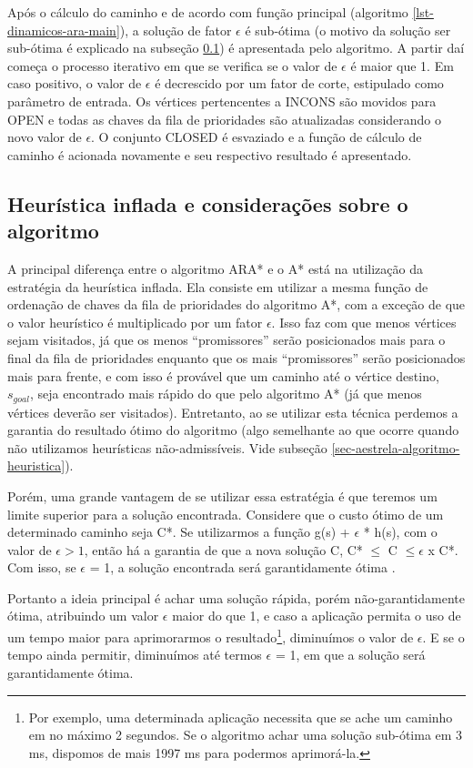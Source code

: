 Após o cálculo do caminho e de acordo com função principal (algoritmo \ref{lst-dinamicos-ara-main}), a solução de fator $\epsilon$ é sub-ótima (o motivo da solução ser sub-ótima é explicado na subseção \ref{sec-dinamicos-ara-consideracoes}) é apresentada pelo algoritmo. A partir daí começa o processo iterativo em que se verifica se o valor de $\epsilon$ é maior que 1. Em caso positivo, o valor de $\epsilon$ é decrescido por um fator de corte, estipulado como parâmetro de entrada. Os vértices pertencentes a INCONS são movidos para OPEN e todas as chaves da fila de prioridades são atualizadas considerando o novo valor de $\epsilon$. O conjunto CLOSED é esvaziado e a função de cálculo de caminho é acionada novamente e seu respectivo resultado é apresentado.

\subsection{Heurística inflada e considerações sobre o algoritmo}
\label{sec-dinamicos-ara-consideracoes}

A principal diferença entre o algoritmo ARA* e o A* está na utilização da estratégia da heurística inflada. Ela consiste em utilizar a mesma função de ordenação de chaves da fila de prioridades do algoritmo A*, com a exceção de que o valor heurístico é multiplicado por um fator $\epsilon$. Isso faz com que menos vértices sejam visitados, já que os menos ``promissores'' serão posicionados mais para o final da fila de prioridades enquanto que os mais ``promissores'' serão posicionados mais para frente, e com isso é provável que um caminho até o vértice destino, $s_{goal}$, seja encontrado mais rápido do que pelo algoritmo A* (já que menos vértices deverão ser visitados). Entretanto, ao se utilizar esta técnica perdemos a garantia do resultado ótimo do algoritmo (algo semelhante ao que ocorre quando não utilizamos heurísticas não-admissíveis. Vide subseção \ref{sec-aestrela-algoritmo-heuristica}).

Porém, uma grande vantagem de se utilizar essa estratégia é que teremos um limite superior para a solução encontrada. Considere que o custo ótimo de um determinado caminho seja C*. Se utilizarmos a função g(s) + $\epsilon$ * h(s), com o valor de $\epsilon > 1$, então há a garantia de que a nova solução C, C* $\leq$ C $\leq \epsilon$ x C*. Com isso, se $\epsilon$ = 1, a solução encontrada será garantidamente ótima \cite{moura2010estudo}.

Portanto a ideia principal é achar uma solução rápida, porém não-garantidamente ótima, atribuindo um valor $\epsilon$ maior do que 1, e caso a aplicação permita o uso de um tempo maior para aprimorarmos o resultado\footnote{Por exemplo, uma determinada aplicação necessita que se ache um caminho em no máximo 2 segundos. Se o algoritmo achar uma solução sub-ótima em 3 ms, dispomos de mais 1997 ms para podermos aprimorá-la.}, diminuímos o valor de $\epsilon$. E se o tempo ainda permitir, diminuímos até termos $\epsilon$ = 1, em que a solução será garantidamente ótima. 


